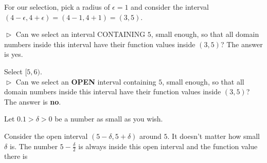\documentclass{ximera}
\begin{document}
\begin{example}
\begin{explanation}
For our selection, pick a radius of $\epsilon = 1$ and consider the interval $(4-\epsilon , 4+\epsilon) = (4-1 , 4+1) = (3,5)$. \\


\begin{image}
\end{image}





$\vartriangleright$ Can we select an interval CONTAINING $5$, small enough, so that all domain numbers inside this interval have their function values inside $(3,5)$?  The answer is yes.

Select $[5, 6)$. \\



$\vartriangleright$ Can we select an \textbf{\textcolor{red!70!black}{OPEN}} interval containing $5$, small enough, so that all domain numbers inside this interval have their function values inside $(3,5)$?  The answer is \textbf{no}.




Let $0.1 > \delta > 0$ be a number as small as you wish.

Consider the open interval $(5-\delta, 5+\delta)$ around $5$. It doesn't matter how small $\delta$ is.  The number $5 - \frac{\delta}{2}$ is always inside this open interval and the function value there is 


\end{explanation}
\end{example}
\end{document}
